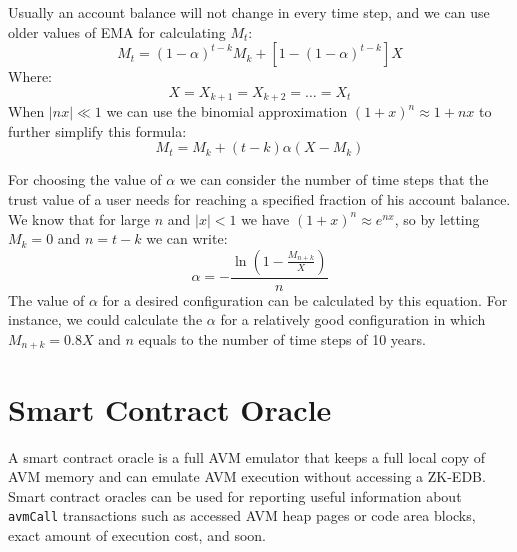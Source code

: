 \documentclass[11pt, A4]{report}
\begin{document}
    Usually an account balance will not change in every time step, and we can use older values of EMA for calculating
    \(M_t\):
    \[
        M_t = (1 - \alpha)^{t-k}M_k + [1 - (1 - \alpha)^{t - k}]X
    \]
    Where:
    \[
        X = X_{k+1} = X_{k+2} = \dots = X_t
    \]
    When \(|nx| \ll 1\) we can use the binomial approximation  \((1 + x)^n \approx 1 + nx\) to further simplify this
    formula:
    \[
        M_t = M_k + (t - k) \alpha (X - M_k)
    \]

    For choosing the value of \(\alpha\) we can consider the number of time steps that the trust value of a user needs
    for reaching a specified fraction of his account balance. We know that for large \(n\) and \(|x| < 1\) we have \(
    (1 + x)^n \approx e^{nx}\), so by letting \(M_k = 0\) and
    \(n = t - k\)
    we can write:
    \[
        \alpha =- \frac{\ln\left(1 - \frac{M_{n+k}}{X}\right)}{n}
    \]
    The value of \(\alpha\) for a desired configuration can be calculated by this equation. For instance, we could
    calculate the \(\alpha\) for a relatively good configuration in which \(M_{n+k} = 0.8X\) and \(n\) equals to the
    number of time steps of 10 years.


    \section{Smart Contract Oracle}\label{sec:smart-contract-oracle}

    A smart contract oracle is a full AVM emulator that keeps a full local copy of AVM memory and can emulate AVM
    execution without accessing a ZK-EDB. Smart contract oracles can be used for reporting useful information about
    \texttt{avmCall} transactions such as accessed AVM heap pages or code area blocks, exact amount of execution cost,
    and soon.
\end{document}
